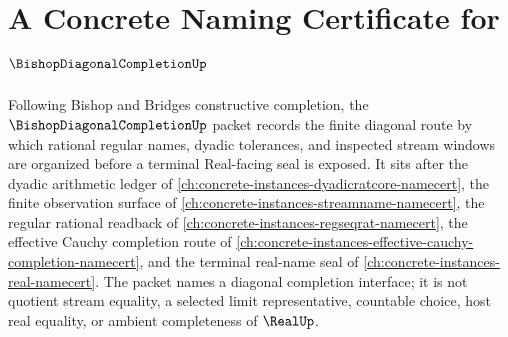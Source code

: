 \chapter{A Concrete Naming Certificate for $\BishopDiagonalCompletionUp$}
\label{ch:concrete-instances-bishop-diagonal-completion-namecert}

Following Bishop and Bridges constructive completion, the $\BishopDiagonalCompletionUp$ packet records the finite diagonal route by which rational regular names, dyadic tolerances, and inspected stream windows are organized before a terminal Real-facing seal is exposed. It sits after the dyadic arithmetic ledger of \autoref{ch:concrete-instances-dyadicratcore-namecert}, the finite observation surface of \autoref{ch:concrete-instances-streamname-namecert}, the regular rational readback of \autoref{ch:concrete-instances-regseqrat-namecert}, the effective Cauchy completion route of \autoref{ch:concrete-instances-effective-cauchy-completion-namecert}, and the terminal real-name seal of \autoref{ch:concrete-instances-real-namecert}. The packet names a diagonal completion interface; it is not quotient stream equality, a selected limit representative, countable choice, host real equality, or ambient completeness of $\RealUp$.

